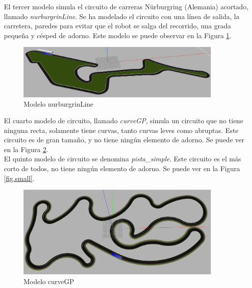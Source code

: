 El tercer modelo simula el circuito de carreras Nürburgring (Alemania) acortado, llamado \textit{nurburgrinLine}. Se ha modelado el circuito con una línea de salida, la carretera, paredes para evitar que el robot se salga del recorrido, una grada pequeña y césped de adorno. Este modelo se puede observar en la Figura \ref{fig.nurburgrin}.\\

\begin{figure}
  \begin{center}
    \includegraphics[width=0.9\textwidth]{figures/Infraestructura/circuit_Nurburgrin.png}
		\caption{Modelo nurburgrinLine}
		\label{fig.nurburgrin}
		\end{center}
\end{figure}

El cuarto modelo de circuito, llamado \textit{curveGP}, simula un circuito que no tiene ninguna recta, solamente tiene curvas, tanto curvas leves como abruptas. Este circuito es de gran tamaño, y no tiene ningún elemento de adorno. Se puede ver en la Figura \ref{fig.curveGP}.\\

El quinto modelo de circuito se denomina \textit{pista\_simple}. Este circuito es el más corto de todos, no tiene ningún elemento de adorno. Se puede ver en la Figura \ref{fig.small}.\\


\begin{figure}[H]
  \begin{center}
    \includegraphics[width=0.9\textwidth]{figures/Infraestructura/circuit_CurveGP.png}
		\caption{Modelo curveGP}
		\label{fig.curveGP}
		\end{center}
\end{figure}

